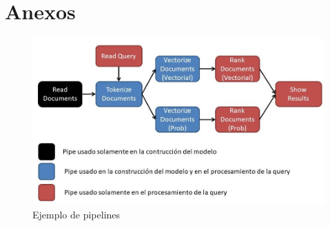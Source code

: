 \documentclass[runningheads]{llncs}
\begin{document}
%
%
%
% 
% 
%
\section{Anexos}

\begin{figure}
\includegraphics[width=\textwidth]{pipeline.jpg}
\caption{Ejemplo de pipelines} \label{pipeline_fig}
\end{figure}
\end{document}
